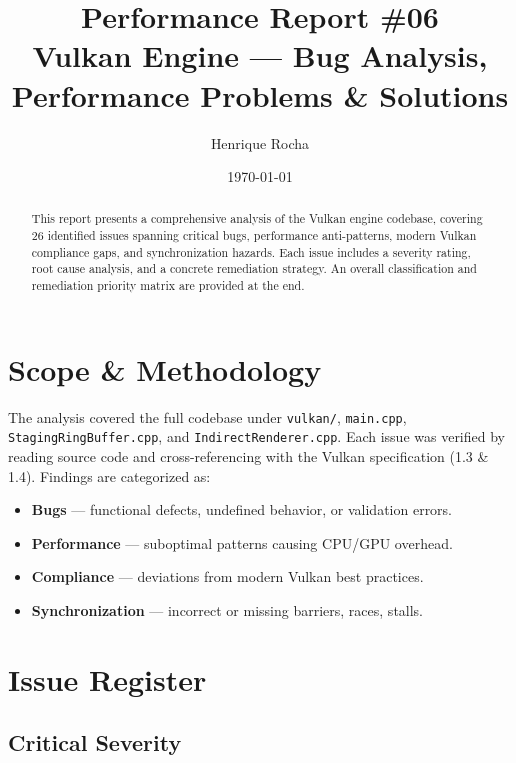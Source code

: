 \documentclass[a4paper,12pt]{article}
\title{\textbf{Performance Report \#06}\\[4pt]
\large Vulkan Engine — Bug Analysis, Performance Problems \& Solutions}
\author{Henrique Rocha}
\date{\today}
\begin{document}
\maketitle

\begin{abstract}
This report presents a comprehensive analysis of the Vulkan engine codebase, covering 26 identified
issues spanning critical bugs, performance anti-patterns, modern Vulkan compliance gaps,
and synchronization hazards. Each issue includes a severity rating, root cause analysis, and
a concrete remediation strategy. An overall classification and remediation priority matrix
are provided at the end.
\end{abstract}

\tableofcontents
\newpage

\section{Scope \& Methodology}

The analysis covered the full codebase under \texttt{vulkan/}, \texttt{main.cpp},
\texttt{StagingRingBuffer.cpp}, and \texttt{IndirectRenderer.cpp}. Each issue was verified
by reading source code and cross-referencing with the Vulkan specification (1.3 \& 1.4).
Findings are categorized as:

\begin{itemize}[noitemsep]
  \item[\textbf{B}] \textbf{Bugs} — functional defects, undefined behavior, or validation errors.
  \item[\textbf{P}] \textbf{Performance} — suboptimal patterns causing CPU/GPU overhead.
  \item[\textbf{C}] \textbf{Compliance} — deviations from modern Vulkan best practices.
  \item[\textbf{S}] \textbf{Synchronization} — incorrect or missing barriers, races, stalls.
\end{itemize}

\section{Issue Register}

\subsection{Critical Severity}
\end{document}
